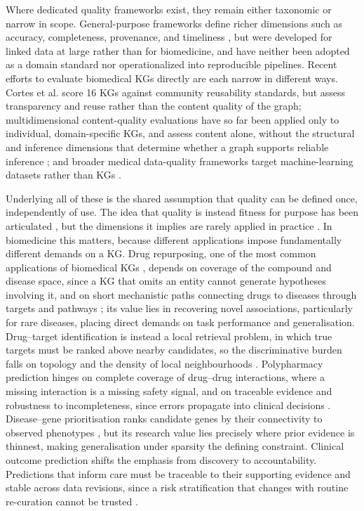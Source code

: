 Where dedicated quality frameworks exist, they remain either taxonomic or narrow in scope. General-purpose frameworks define richer dimensions such as accuracy, completeness, provenance, and timeliness \cite{wang1996,zaveri2016,debattista2018}, but were developed for linked data at large rather than for biomedicine, and have neither been adopted as a domain standard nor operationalized into reproducible pipelines. Recent efforts to evaluate biomedical KGs directly are each narrow in different ways. Cortes et al. \cite{cortes2025} score 16 KGs against community reusability standards, but assess transparency and reuse rather than the content quality of the graph; multidimensional content-quality evaluations have so far been applied only to individual, domain-specific KGs, and assess content alone, without the structural and inference dimensions that determine whether a graph supports reliable inference \cite{liu2024,nguyen2023}; and broader medical data-quality frameworks target machine-learning datasets rather than KGs \cite{schwabe2024}.

Underlying all of these is the shared assumption that quality can be defined once, independently of use. The idea that quality is instead fitness for purpose has been articulated \cite{chen2019}, but the dimensions it implies are rarely applied in practice \cite{paulheim2017,xue2023}. In biomedicine this matters, because different applications impose fundamentally different demands on a KG. Drug repurposing, one of the most common applications of biomedical KGs \cite{jarada2020,li2022}, depends on coverage of the compound and disease space, since a KG that omits an entity cannot generate hypotheses involving it, and on short mechanistic paths connecting drugs to diseases through targets and pathways \cite{wei2025multihop}; its value lies in recovering novel associations, particularly for rare diseases, placing direct demands on task performance and generalisation. Drug--target identification is instead a local retrieval problem, in which true targets must be ranked above nearby candidates, so the discriminative burden falls on topology and the density of local neighbourhoods \cite{mei2013}. Polypharmacy prediction hinges on complete coverage of drug--drug interactions, where a missing interaction is a missing safety signal, and on traceable evidence and robustness to incompleteness, since errors propagate into clinical decisions \cite{novacek2020}. Disease--gene prioritisation ranks candidate genes by their connectivity to observed phenotypes \cite{bromberg2013,gnanaolivu2025}, but its research value lies precisely where prior evidence is thinnest, making generalisation under sparsity the defining constraint. Clinical outcome prediction shifts the emphasis from discovery to accountability. Predictions that inform care must be traceable to their supporting evidence and stable across data revisions, since a risk stratification that changes with routine re-curation cannot be trusted \cite{li2022}.

